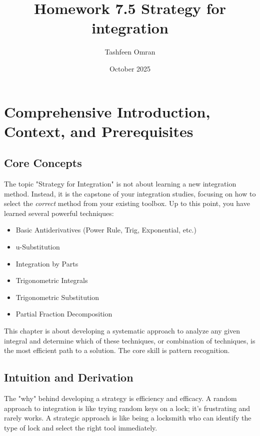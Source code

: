 \documentclass{article}
\author{Tashfeen Omran}
\title{Homework 7.5 Strategy for integration}
\date{October 2025}
\begin{document}
\maketitle

\section{Comprehensive Introduction, Context, and Prerequisites}

\subsection{Core Concepts}
The topic "Strategy for Integration" is not about learning a new integration method. Instead, it is the capstone of your integration studies, focusing on how to select the \textit{correct} method from your existing toolbox. Up to this point, you have learned several powerful techniques:
\begin{itemize}
    \item Basic Antiderivatives (Power Rule, Trig, Exponential, etc.)
    \item u-Substitution
    \item Integration by Parts
    \item Trigonometric Integrals
    \item Trigonometric Substitution
    \item Partial Fraction Decomposition
\end{itemize}
This chapter is about developing a systematic approach to analyze any given integral and determine which of these techniques, or combination of techniques, is the most efficient path to a solution. The core skill is pattern recognition.

\subsection{Intuition and Derivation}
The "why" behind developing a strategy is efficiency and efficacy. A random approach to integration is like trying random keys on a lock; it's frustrating and rarely works. A strategic approach is like being a locksmith who can identify the type of lock and select the right tool immediately.
\end{document}

